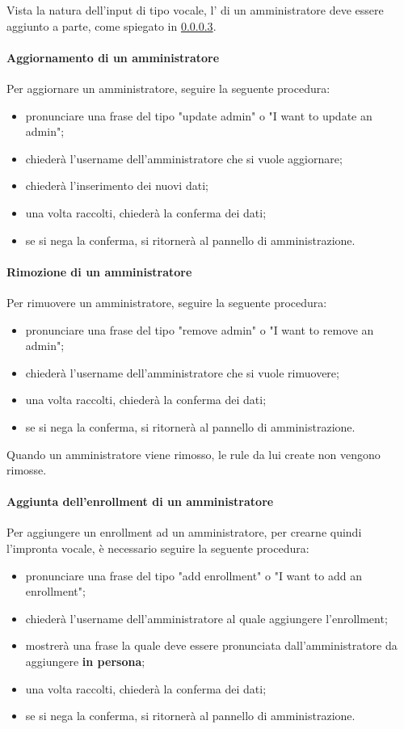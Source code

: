 Vista la natura dell'input di tipo vocale, l' di un amministratore deve essere aggiunto a parte, come spiegato in \ref{addEnrollment}.
\paragraph{Aggiornamento di un amministratore}
 Per aggiornare un amministratore, seguire la seguente procedura:
\begin{itemize}
	\item pronunciare una frase del tipo "update admin" o "I want to update an admin";
	\item \PROGETTO{} chiederà l'username dell'amministratore che si vuole aggiornare;
	\item \PROGETTO{} chiederà l'inserimento dei nuovi dati;
	\item una volta raccolti, \PROGETTO{} chiederà la conferma dei dati;
	\item se si nega la conferma, si ritornerà al pannello di amministrazione.
\end{itemize}

\paragraph{Rimozione di un amministratore}
 Per rimuovere un amministratore, seguire la seguente procedura:
\begin{itemize}
	\item pronunciare una frase del tipo "remove admin" o "I want to remove an admin";
	\item \PROGETTO{} chiederà l'username dell'amministratore che si vuole rimuovere;
	\item una volta raccolti, \PROGETTO{} chiederà la conferma dei dati;
	\item se si nega la conferma, si ritornerà al pannello di amministrazione.
\end{itemize}

Quando un amministratore viene rimosso, le rule da lui create non vengono rimosse.
\paragraph{Aggiunta dell'enrollment di un amministratore}\label{addEnrollment}

Per aggiungere un enrollment ad un amministratore, per crearne quindi l'impronta vocale, è necessario seguire la seguente procedura:
\begin{itemize}
	\item pronunciare una frase del tipo "add enrollment" o "I want to add an enrollment";
	\item \PROGETTO{} chiederà l'username dell'amministratore al quale aggiungere l'enrollment;
	\item \PROGETTO{} mostrerà una frase la quale deve essere pronunciata dall'amministratore da aggiungere \textbf{in persona}; 
	\item una volta raccolti, \PROGETTO{} chiederà la conferma dei dati;
	\item se si nega la conferma, si ritornerà al pannello di amministrazione.
\end{itemize}
